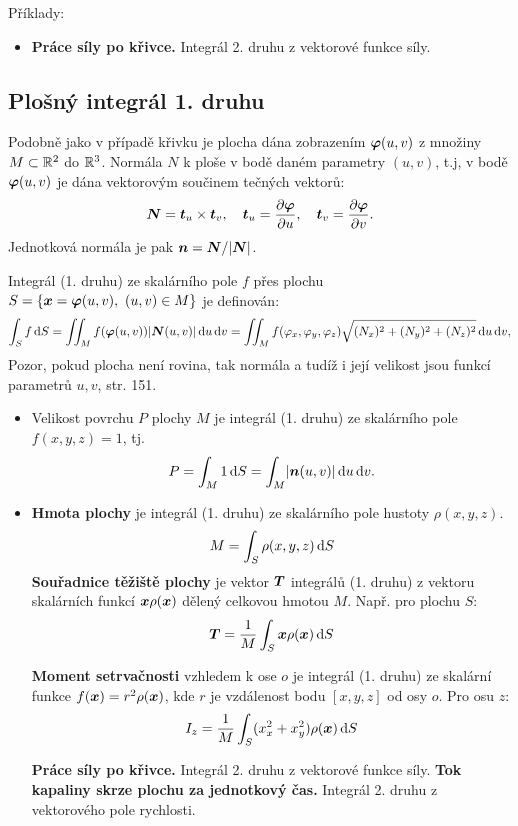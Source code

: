 Příklady:
\begin{itemize}
 \item {\bf Práce síly po křivce.} Integrál 2. druhu z vektorové funkce síly.
\end{itemize}




\subsection{Plošný integrál 1. druhu}
Podobně jako v případě křivku je plocha dána zobrazením $\mathbf{\boldsymbol{\varphi}}(u,v)$ z množiny $M\subset {\mathbb R}^2$ do ${\mathbb R}^3$. Normála $N$ k ploše v bodě daném parametry $(u,v)$, 
t.j, v bodě $\mathbf{\boldsymbol{\varphi}}(u,v)$ je dána vektorovým součinem tečných vektorů:
\[
   \mathbf{\boldsymbol{N}}= \mathbf{\boldsymbol{t}}_u \times \mathbf{\boldsymbol{t}}_v,\quad \mathbf{\boldsymbol{t}}_u = \frac{\partial \mathbf{\boldsymbol{\varphi}}}{\partial u},\quad \mathbf{\boldsymbol{t}}_v=\frac{\partial \mathbf{\boldsymbol{\varphi}}}{\partial v}.
\]
Jednotková normála je pak $\mathbf{\boldsymbol{n}} = \mathbf{\boldsymbol{N}} /\lvert\mathbf{\boldsymbol{N}}\rvert$.

Integrál (1. druhu) ze skalárního pole $f$ přes plochu $S=\{\mathbf{\boldsymbol{x}} = \mathbf{\boldsymbol{\varphi}}(u,v),\ (u,v) \in M\}$ je definován:
\begin{equation}
    \label{eq:surf_1_int}
   \int_S f \,{\rm d} S = \iint_M f(\mathbf{\boldsymbol{\varphi}}(u,v)) \lvert\mathbf{\boldsymbol{N}}(u,v)\rvert \,{\rm d} u\,{\rm d} v=
   \iint_M f(\varphi_x,\varphi_y,\varphi_z) \sqrt{ (N_x)^2 + (N_y)^2 + (N_z)^2} \,{\rm d} u\,{\rm d} v, 
\end{equation}
Pozor, pokud plocha není rovina, tak normála a tudíž i její velikost jsou funkcí parametrů $u, v$, \cite{CVUT} str. 151.

\begin{itemize}
 \item Velikost povrchu $P$  plochy $M$ je integrál (1. druhu) ze skalárního pole $f(x,y,z)=1$, tj.
\[   
   P=\int_M 1 \,{\rm d} S = \int_M \lvert\mathbf{\boldsymbol{n}}(u,v)\rvert \,{\rm d} u\,{\rm d} v.
\]
\item {\bf Hmota plochy} je integrál (1. druhu) ze skalárního pole hustoty $\rho(x,y,z)$.
\[
        M=\int_S \rho(x,y,z) \,{\rm d} S
\]
{\bf Souřadnice těžiště plochy} je vektor $\mathbf{\boldsymbol{T}}$ integrálů (1. druhu) z vektoru skalárních funkcí 
$ \mathbf{\boldsymbol{x}} \rho( \mathbf{\boldsymbol{x}})$ dělený celkovou hmotou $M$. Např. pro plochu $S$:
\[
        \mathbf{\boldsymbol{T}}=\frac{1}{M}\int_S \mathbf{\boldsymbol{x}}\rho(\mathbf{\boldsymbol{x}}) \,{\rm d} S
\]

{\bf Moment setrvačnosti} vzhledem k ose $o$ je integrál (1. druhu) ze skalární funkce $f(\mathbf{\boldsymbol{x}})=r^2\rho(\mathbf{\boldsymbol{x}})$, 
kde $r$ je vzdálenost bodu $[x,y,z]$ od osy $o$. Pro osu $z$:
\[
    I_z = \frac{1}{M} \int_S (x_x^2 + x_y^2) \rho(\mathbf{\boldsymbol{x}}) \,{\rm d} S
\]

{\bf Práce síly po křivce.} Integrál 2. druhu z vektorové funkce síly.
{\bf Tok kapaliny skrze plochu za jednotkový čas.} Integrál 2. druhu z vektorového pole rychlosti.

\end{itemize}


